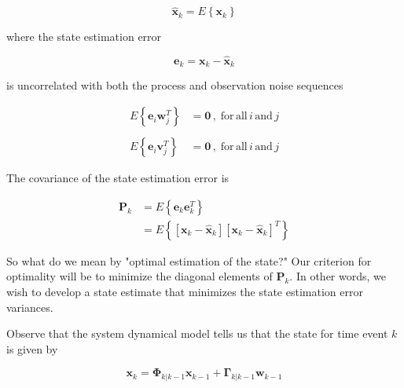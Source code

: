 \begin{equation}
    \hat{\mathbf{x}}_k = E \left\{ \mathbf{x}_k \right\}
    \label{eq:state-estimate}
\end{equation}

where the state estimation error

\begin{equation*}
    \mathbf{e}_k = \mathbf{x}_{k} - \hat{\mathbf{x}}_k
\end{equation*}

is uncorrelated with both the process and observation noise sequences

\begin{equation*}
    \begin{aligned}
        E \left\{ \mathbf{e}_i \mathbf{w}_j^T \right\} &= \mathbf{0} \, , \phantom{.} \mathrm{for} \, \mathrm{all} \, i \, \mathrm{and} \, j \\
        \phantom{.} \\
        E \left\{ \mathbf{e}_i \mathbf{v}_j^T \right\} &= \mathbf{0} \, , \phantom{.} \mathrm{for} \, \mathrm{all} \, i \, \mathrm{and} \, j
    \end{aligned}
\end{equation*}

The covariance of the state estimation error is

\begin{equation}
    \begin{aligned}
        \mathbf{P}_k &= E \left\{ \mathbf{e}_k \mathbf{e}_k^T \right\} \\
        &= E \left\{ \left[ \mathbf{x}_{k} - \hat{\mathbf{x}}_k \right] \left[ \mathbf{x}_{k} - \hat{\mathbf{x}}_k \right]^T \right\}
    \end{aligned}
    \label{eq:state-estimate-error-covariance}
\end{equation}

So what do we mean by "optimal estimation of the state?" Our criterion for optimality will
be to minimize the diagonal elements of $\mathbf{P}_k$. In other words, we wish to develop
a state estimate that minimizes the state estimation error variances.

Observe that the system dynamical model tells us that the state for time event $k$ is
given by

\begin{equation*}
    \mathbf{x}_{k} = \mathbf{\Phi}_{k|k-1} \mathbf{x}_{k-1} + \mathbf{\Gamma}_{k|k-1} \mathbf{w}_{k-1}
\end{equation*}

